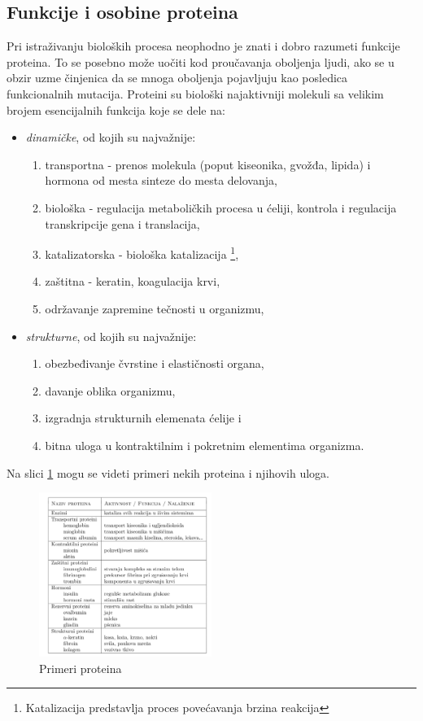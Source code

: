 \subsection{Funkcije i osobine proteina}
Pri istraživanju bioloških procesa neophodno je znati i dobro razumeti funkcije proteina. To se posebno može uočiti kod proučavanja oboljenja ljudi, ako se u obzir uzme činjenica da se mnoga oboljenja pojavljuju kao posledica funkcionalnih mutacija. Proteini su biološki najaktivniji molekuli sa velikim brojem esencijalnih funkcija koje se dele na:
\begin{itemize}
\item \textit{dinamičke}, od kojih su najvažnije:
\begin{enumerate} 
\item transportna - prenos molekula (poput kiseonika, gvožđa, lipida) i hormona od mesta sinteze do mesta delovanja,
\item biološka - regulacija metaboličkih procesa u ćeliji, kontrola i regulacija transkripcije gena i translacija,
\item katalizatorska - biološka katalizacija \footnote{Katalizacija predstavlja proces povećavanja brzina reakcija},
\item zaštitna - keratin, koagulacija krvi,
\item održavanje zapremine tečnosti u organizmu,
\end{enumerate}
\item \textit{strukturne}, od kojih su najvažnije:
\begin{enumerate}
\item obezbeđivanje čvrstine i elastičnosti organa,
\item davanje oblika organizmu,
\item izgradnja strukturnih elemenata ćelije i
\item bitna uloga u kontraktilnim i pokretnim elementima organizma.
\end{enumerate}
\end{itemize} 
Na slici \ref{fig:primeriproteina} mogu se videti primeri nekih proteina i njihovih uloga.
\begin{figure}[H]
	\centering
    \includegraphics[width=0.5\textwidth]{Figures/BO/primeriproteina.png}
    \caption{Primeri proteina~\cite{Principi}}
    \label{fig:primeriproteina}
\end{figure}	

